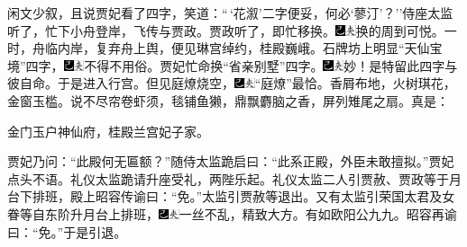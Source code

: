 闲文少叙，且说贾妃看了四字，笑道：``\,`花溆'二字便妥，何必`蓼汀'？''侍座太监听了，忙下小舟登岸，飞传与贾政。贾政听了，即忙移换。{\includegraphics[width=3mm]{../Images/00003}\includegraphics[width=3mm]{../Images/00012}\footnotesize \kaishu 换的周到可悦。}一时，舟临内岸，复弃舟上舆，便见琳宫绰约，桂殿巍峨。石牌坊上明显``天仙宝境''四字，{\includegraphics[width=3mm]{../Images/00003}\includegraphics[width=3mm]{../Images/00012}\footnotesize \kaishu 不得不用俗。}贾妃忙命换``省亲别墅''四字。{\includegraphics[width=3mm]{../Images/00003}\includegraphics[width=3mm]{../Images/00012}\footnotesize \kaishu 妙！是特留此四字与彼自命。}于是进入行宫。但见庭燎烧空，{\includegraphics[width=3mm]{../Images/00003}\includegraphics[width=3mm]{../Images/00012}\footnotesize \kaishu ``庭燎''最恰。}香屑布地，火树琪花，金窗玉槛。说不尽帘卷虾须，毯铺鱼獭，鼎飘麝脑之香，屏列雉尾之扇。真是：

金门玉户神仙府，桂殿兰宫妃子家。

贾妃乃问：``此殿何无匾额？''随侍太监跪启曰：``此系正殿，外臣未敢擅拟。''贾妃点头不语。礼仪太监跪请升座受礼，两陛乐起。礼仪太监二人引贾赦、贾政等于月台下排班，殿上昭容传谕曰：``免。''太监引贾赦等退出。又有太监引荣国太君及女眷等自东阶升月台上排班，{\includegraphics[width=3mm]{../Images/00003}\includegraphics[width=3mm]{../Images/00012}\footnotesize \kaishu 一丝不乱，精致大方。有如欧阳公九九。}昭容再谕曰：``免。''于是引退。

